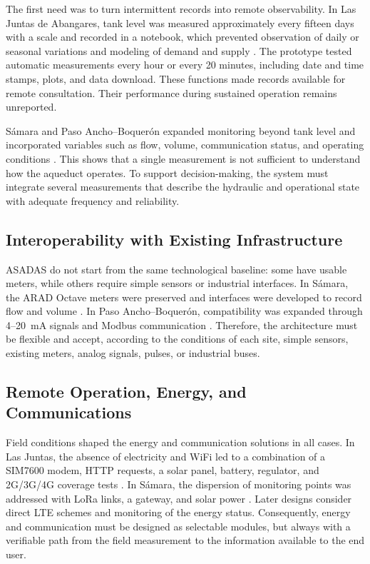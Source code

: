 \documentclass[conference]{IEEEtran}
\begin{document}
The first need was to turn intermittent records into remote observability. In Las Juntas de Abangares, tank level was measured approximately every fifteen days with a scale and recorded in a notebook, which prevented observation of daily or seasonal variations and modeling of demand and supply \cite{chavarria2021implementacion}. The prototype tested automatic measurements every hour or every 20 minutes, including date and time stamps, plots, and data download. These functions made records available for remote consultation. Their performance during sustained operation remains unreported.

S\'{a}mara and Paso Ancho--Boquer\'{o}n expanded monitoring beyond tank level and incorporated variables such as flow, volume, communication status, and operating conditions \cite{solorzano2021sistema,oviedo2024desarrollo}. This shows that a single measurement is not sufficient to understand how the aqueduct operates. To support decision-making, the system must integrate several measurements that describe the hydraulic and operational state with adequate frequency and reliability.

\subsection{Interoperability with Existing Infrastructure}

ASADAS do not start from the same technological baseline: some have usable meters, while others require simple sensors or industrial interfaces. In S\'{a}mara, the ARAD Octave meters were preserved and interfaces were developed to record flow and volume \cite{solorzano2021sistema}. In Paso Ancho--Boquer\'{o}n, compatibility was expanded through 4--20~mA signals and Modbus communication \cite{oviedo2024desarrollo}. Therefore, the architecture must be flexible and accept, according to the conditions of each site, simple sensors, existing meters, analog signals, pulses, or industrial buses.

\subsection{Remote Operation, Energy, and Communications}

Field conditions shaped the energy and communication solutions in all cases. In Las Juntas, the absence of electricity and WiFi led to a combination of a SIM7600 modem, HTTP requests, a solar panel, battery, regulator, and 2G/3G/4G coverage tests \cite{chavarria2021implementacion}. In S\'{a}mara, the dispersion of monitoring points was addressed with LoRa links, a gateway, and solar power \cite{solorzano2021sistema}. Later designs consider direct LTE schemes and monitoring of the energy status. Consequently, energy and communication must be designed as selectable modules, but always with a verifiable path from the field measurement to the information available to the end user.
\end{document}
